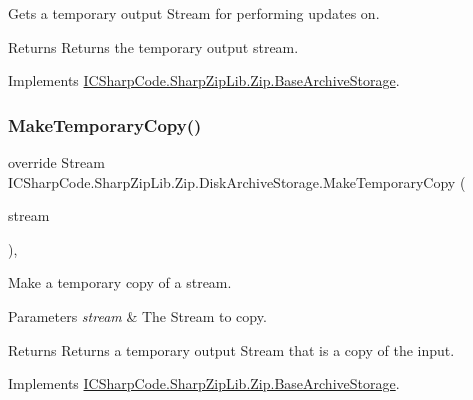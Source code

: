 Gets a temporary output Stream for performing updates on. 

\begin{DoxyReturn}{Returns}
Returns the temporary output stream.
\end{DoxyReturn}


Implements \hyperlink{class_i_c_sharp_code_1_1_sharp_zip_lib_1_1_zip_1_1_base_archive_storage_a1327afcc22749a88959c9d8614cf4c75}{I\+C\+Sharp\+Code.\+Sharp\+Zip\+Lib.\+Zip.\+Base\+Archive\+Storage}.

\mbox{\label{class_i_c_sharp_code_1_1_sharp_zip_lib_1_1_zip_1_1_disk_archive_storage_abe8267ae880501446aa0892c8f93a657}} 
\subsubsection{\texorpdfstring{Make\+Temporary\+Copy()}{MakeTemporaryCopy()}}
{\footnotesize\ttfamily override Stream I\+C\+Sharp\+Code.\+Sharp\+Zip\+Lib.\+Zip.\+Disk\+Archive\+Storage.\+Make\+Temporary\+Copy (\begin{DoxyParamCaption}\item[{Stream}]{stream }\end{DoxyParamCaption})\hspace{0.3cm}{\ttfamily [inline]}, {\ttfamily [virtual]}}



Make a temporary copy of a stream. 


\begin{DoxyParams}{Parameters}
{\em stream} & The Stream to copy.\\
\hline
\end{DoxyParams}
\begin{DoxyReturn}{Returns}
Returns a temporary output Stream that is a copy of the input.
\end{DoxyReturn}


Implements \hyperlink{class_i_c_sharp_code_1_1_sharp_zip_lib_1_1_zip_1_1_base_archive_storage_a3580cacd0a0e6b3045bdeeaed72cb492}{I\+C\+Sharp\+Code.\+Sharp\+Zip\+Lib.\+Zip.\+Base\+Archive\+Storage}.

